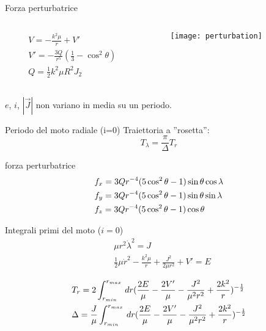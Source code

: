 \begin{frame}{Forza perturbatrice}
\begin{columns}
\begin{column}{0.6\textwidth}
\begin{align*}
&V=-\frac{k^2\mu}{r}+V'\\
&V'=-\frac{3Q}{r^5}(\frac{1}{3}-\cos^2{\theta})\\
&Q=\frac{1}{2}k^2\mu R^2J_2
\end{align*}
\end{column}
\begin{column}{0.4\textwidth}
\begin{figure}[!ht]
\texttt{[image: perturbation]}
\end{figure}
\end{column}
\end{columns}
$e$, $i$, $|\vec{J}|$ non variano in media su un periodo.
\begin{block}{Periodo del moto radiale (i=0)}
Traiettoria a ''rosetta'':
\begin{equation*}
T_{\lambda}=\frac{\pi}{\Delta}T_{r}
\end{equation*}
\end{block}
\end{frame}

\begin{wordonframe}{forza perturbatrice}
\begin{align*}
&f_x=3Qr^{-4}(5\cos^2{\theta}-1)\sin{\theta}\cos{\lambda}\\
&f_y=3Qr^{-4}(5\cos^2{\theta}-1)\sin{\theta}\sin{\lambda}\\
&f_z=3Qr^{-4}(5\cos^2{\theta}-1)\cos{\theta}
\end{align*}
\begin{block}{Integrali primi del moto ($i=0$)}
\begin{align*}
&\mu r^2\dot{\lambda}^2=J\\
&\frac{1}{2}\mu\dot{r}^2-\frac{k^2\mu}{r}+\frac{J^2}{2\mu r^2}+V'=E
\end{align*}
\end{block}
\begin{align*}
&T_r=2\int_{r_{min}}^{r_{max}}\,dr(\frac{2E}{\mu}-\frac{2V'}{\mu}-\frac{J^2}{\mu^2r^2}+\frac{2k^2}{r})^{-\frac{1}{2}}\\
&\Delta=\frac{J}{\mu}\int_{r_{min}}^{r_{max}}\,dr(\frac{2E}{\mu}-\frac{2V'}{\mu}-\frac{J^2}{\mu^2r^2}+\frac{2k^2}{r})^{-\frac{1}{2}}
\end{align*}
\end{wordonframe}

